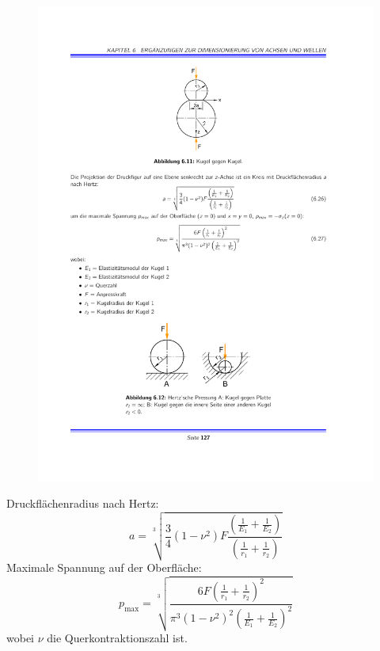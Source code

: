 			\begin{figure}
				\vspace{-2cm}
				\includegraphics[scale=.8]{graphics/kugel_gegen_kugel}
			\end{figure}
		
			Druckflächenradius nach Hertz:
			\begin{equation*}
				a = \sqrt[3]{\frac{3}{4}(1-\nu^2)F\frac{\left( \frac{1}{E_1}+\frac{1}{E_2}\right)}{\left( \frac{1}{r_1}+ \frac{1}{r_2}\right)}}
			\end{equation*}
			Maximale Spannung auf der Oberfläche:
			\begin{equation*}
				p_{\text{max}}=\sqrt[3]{\frac{6F\left( \frac{1}{r_1}+ \frac{1}{r_2}\right)^2}{\pi^3(1-\nu^2)^2\left( \frac{1}{E_1}+\frac{1}{E_2}\right)^2}}
			\end{equation*}
			wobei $\nu$ die Querkontraktionszahl ist. 

